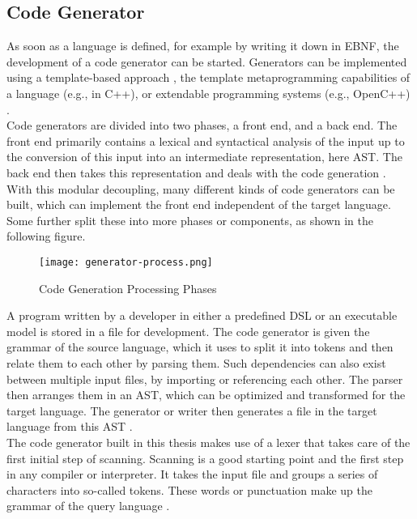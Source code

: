 \subsection{Code Generator}\label{sec:code-gen}
As soon as a language is defined, for example by writing it down in \ac{EBNF}, the development of a code generator can be started. Generators can be implemented using a template-based approach \parencite[see][]{cleaveland_program_2001}, the template metaprogramming capabilities of a language (e.g., in C++), or extendable programming systems (e.g., OpenC++) \parencite[cf.][p. 16]{czarnecki_generative_2000}.\\
Code generators are divided into two phases, a front end, and a back end. The front end primarily contains a lexical and syntactical analysis of the input up to the conversion of this input into an intermediate representation, here \ac{AST}. The back end then takes this representation and deals with the code generation \parencite[cf.][p. 7]{wirth_compiler_1996}. With this modular decoupling, many different kinds of code generators can be built, which can implement the front end independent of the target language.\\
Some further split these into more phases or components, as shown in the following figure.
\begin{figure}[H]
    \caption{Code Generation Processing Phases}
    \label{fig:generator-process}
    \texttt{[image: generator-process.png]}
    \\
    \cite[Source: Based on][p. 5]{sarkar_code_2001}
\end{figure}
A program written by a developer in either a predefined \ac{DSL} or an executable model is stored in a file for development. The code generator is given the grammar of the source language, which it uses to split it into tokens and then relate them to each other by parsing them. Such dependencies can also exist between multiple input files, by importing or referencing each other. The parser then arranges them in an \ac{AST}, which can be optimized and transformed for the target language. The generator or writer then generates a file in the target language from this \ac{AST} \parencite[cf.][pp. 5-6]{sarkar_code_2001}.\\
The code generator built in this thesis makes use of a lexer that takes care of the first initial step of scanning. Scanning is a good starting point and the first step in any compiler or interpreter. It takes the input file and groups a series of characters into so-called tokens. These words or punctuation make up the grammar of the query language \parencite[cf.][p. 39]{nystrom_crafting_2021}.\\
